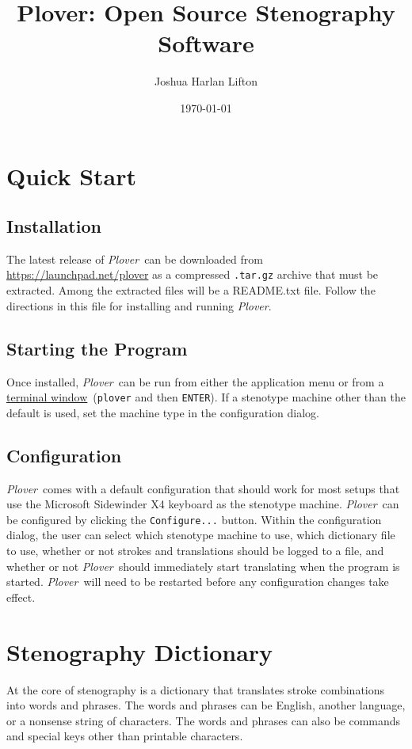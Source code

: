 \documentclass[11pt]{article}
\newcommand{\plover}{\emph{Plover}}
\newcommand{\code}[1]{\texttt{#1}}
\newcommand{\terminal}{\href{https://help.ubuntu.com/community/UsingTheTerminal}{terminal window}}
\begin{document}
\setlength{\parindent}{0pt} %

\title{Plover: Open Source Stenography Software}
\author{Joshua Harlan Lifton}
\date{\today}

\maketitle

\section{Quick Start}

\subsection{Installation}
The latest release of \plover~can be downloaded from
\url{https://launchpad.net/plover} as a compressed \code{.tar.gz}
archive that must be extracted. Among the extracted files will be a
README.txt file. Follow the directions in this file for installing and
running \plover.

\subsection{Starting the Program}
Once installed, \plover~can be run from either the application menu or
from a \terminal~(\code{plover} and then \code{ENTER}). If a stenotype
machine other than the default is used, set the machine type in the
configuration dialog.

\subsection{Configuration}
\label{config}

\plover~comes with a default configuration that should work for most
setups that use the Microsoft Sidewinder X4 keyboard as the stenotype
machine. \plover~can be configured by clicking the \code{Configure...}
button. Within the configuration dialog, the user can select which
stenotype machine to use, which dictionary file to use, whether or not
strokes and translations should be logged to a file, and whether or
not \plover~should immediately start translating when the program is
started. \plover~will need to be restarted before any configuration
changes take effect.

\section{Stenography Dictionary}
At the core of stenography is a dictionary that translates stroke
combinations into words and phrases. The words and phrases can be
English, another language, or a nonsense string of characters. The
words and phrases can also be commands and special keys other than
printable characters.
\end{document}
